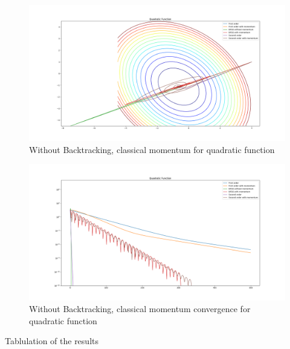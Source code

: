 \documentclass{article}
\begin{document}
\begin{figure}[H]
	\includegraphics[width=\linewidth]{../Images/quadraticmomentum.png}
	\caption{Without Backtracking, classical momentum for quadratic function}
	\label{fig:Without Backtracking, classical momentum for quadratic function}
\end{figure}

\begin{figure}[H]
	\includegraphics[width=\linewidth]{../Images/quadraticmomentum1.png}
	\caption{Without Backtracking, classical momentum convergence for quadratic function}
	\label{fig:Without Backtracking, classical momentum convergence for quadratic function}
\end{figure}

Tablulation of the results
\end{document}

